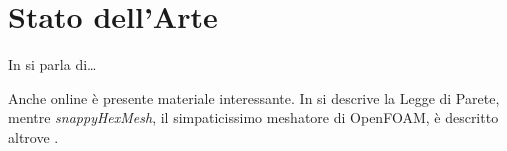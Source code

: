 %
%
\chapter{Stato dell'Arte}
%
\label{cap:statoarte}
%
%
In \cite{cheli:2011:steady-and-moving-high-speed} si parla di\dots
%
\par Anche online è presente materiale interessante. In \cite{wikipedia:2013:law-of-the-wall} si descrive la Legge di Parete, mentre \emph{snappyHexMesh}, il simpaticissimo meshatore di \ac{OpenFOAM}, è descritto altrove \parencite{engys:2012:a-comprehensive-tour-of-snappyhexmesh}.
%
\lipsum[1-3]
%
